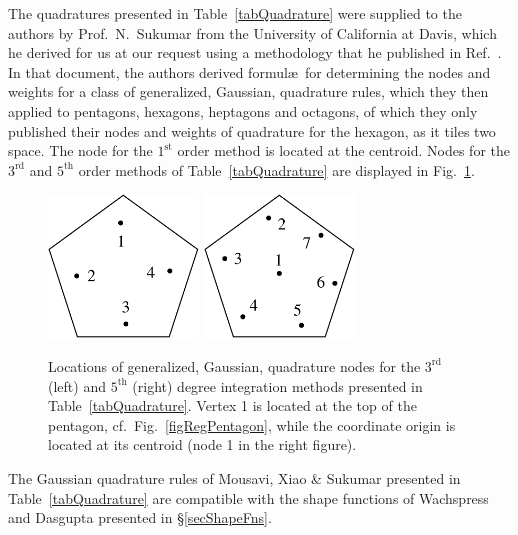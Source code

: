 The quadratures presented in Table~\ref{tabQuadrature} were supplied to the authors by Prof.\ N.\ Sukumar from the University of California at Davis, which he derived for us at our request using a methodology that he published in Ref.~\cite{Mousavietal10}.  In that document, the authors derived formul\ae\ for determining the nodes and weights for a class of generalized, Gaussian, quadrature rules, which they then applied to pentagons, hexagons, heptagons and octagons, of which they only published their nodes and weights of quadrature for the hexagon, as it tiles two space.  The node for the $1^{\mathrm{st}}$ order method is located at the centroid.  Nodes for the $3^{\mathrm{rd}}$ and $5^{\mathrm{th}}$ order methods of Table~\ref{tabQuadrature} are displayed in Fig.~\ref{figQuadrature}.

\begin{figure}
    \centering
    \includegraphics[width=4cm]{figures/pentagon_degree3.pdf}
    \hspace{1cm}
    \includegraphics[width=4cm]{figures/pentagon_degree5.pdf}
    \caption{Locations of generalized, Gaussian, quadrature nodes for the $3^{\mathrm{rd}}$ (left) and $5^{\mathrm{th}}$ (right) degree integration methods presented in Table~\ref{tabQuadrature}.  Vertex 1 is located at the top of the pentagon, cf.\ Fig.~\ref{figRegPentagon}, while the coordinate origin is located at its centroid (node 1 in the right figure).}
    \label{figQuadrature}
\end{figure}

The Gaussian quadrature rules of Mousavi, Xiao \& Sukumar \cite{Mousavietal10} presented in Table~\ref{tabQuadrature} are compatible with the shape functions of Wachspress \cite{Wachspress75,Wachspress16} and Dasgupta \cite{Dasgupta03} presented in \S\ref{secShapeFns}.

